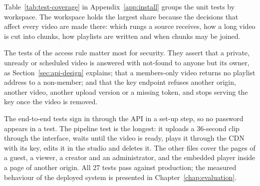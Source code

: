 Table~\ref{tab:test-coverage} in Appendix~\ref{app:install} groups the unit tests by workspace. The  workspace holds
the largest share because the decisions that affect every video are made there: which rungs a source
receives, how a long video is cut into chunks, how playlists are written and when chunks may be
joined.

The tests of the access rule matter most for security. They assert that a private, unready or
scheduled video is answered with not-found to anyone but its owner, as Section~\ref{sec:api-design}
explains; that a members-only video
returns no playlist address to a non-member; and that the key endpoint refuses another origin,
another video, another upload version or a missing token, and stops serving the key once the video is
removed.

The end-to-end tests sign in through the API in a set-up step, so no password appears in a test. The
pipeline test is the longest: it uploads a 36-second clip through the interface, waits until the
video is ready, plays it through the CDN with its key, edits it in the studio and deletes it. The
other files cover the pages of a guest, a viewer, a creator and an administrator, and the embedded
player inside a page of another origin. All 27 tests pass against production; the measured behaviour of the deployed system is presented in
Chapter~\ref{chap:evaluation}.
